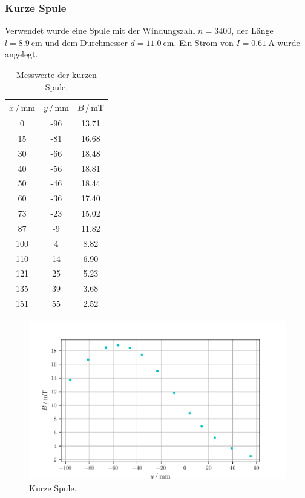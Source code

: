     \subsubsection{Kurze Spule}
    Verwendet wurde eine Spule mit der Windungszahl $n=3400$, der Länge $l=\SI{8.9}{\centi\meter}$ und dem Durchmesser
    $d=\SI{11.0}{\centi\meter}$. Ein Strom von $I=\SI{0.61}{\ampere}$ wurde angelegt. 
    \begin{table}
    \centering
    \caption{Messwerte der kurzen Spule.}
    \label{tab:kurzSp}
        \begin{tabular}{S[table-format=3.0] S[table-format=2.0] S[table-format=2.2]}
            \toprule
            {$x\,/\,\mathrm{mm}$} & {$y\,/\,\mathrm{mm}$} & {$B\,/\,\mathrm{mT}$}\\
               & -96   & 13.71 \\
            15  & -81   & 16.68 \\
            30  & -66   & 18.48 \\
            40  & -56   & 18.81 \\
            50  & -46   & 18.44 \\
            60  & -36   & 17.40 \\
            73  & -23   & 15.02 \\
            87  & -9    & 11.82 \\
            100 & 4     & 8.82  \\
            110 & 14    & 6.90  \\
            121 & 25    & 5.23  \\
            135 & 39    & 3.68  \\
            151 & 55    & 2.52  \\
            \bottomrule
        \end{tabular}
    \end{table}
    \begin{figure}
        \centering
        \includegraphics[width=\textwidth]{Plots/plot_kurzSp.pdf}
        \caption{Kurze Spule.}
        \label{fig:kurz}
    \end{figure}
    \pagebreak
